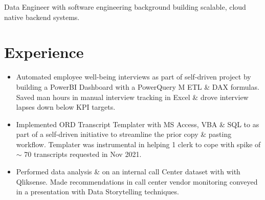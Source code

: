 %
%


\fancyhead{} %


Data Engineer with software engineering background building scalable, cloud native backend systems.

\section{Experience}
\begin{itemize}
  \item Automated employee well-being interviews as part of self-driven project by
    building a PowerBI Dashboard with a PowerQuery M ETL \& DAX formulas. Saved man hours
    in manual interview tracking in Excel \& drove interview lapses down below KPI targets.

  \item Implemented ORD Transcript Templater with MS Access, VBA \& SQL to as part
    of a self-driven initiative to streamline the prior copy \& pasting workflow.
    Templater was instrumental in helping 1 clerk to cope with spike of $\sim$ 
    70 transcripts requested in Nov 2021.

  \item Performed data analysis \& on an internal call Center dataset with
    with Qliksense. Made recommendations in call center vendor monitoring 
    conveyed in a presentation with Data Storytelling techniques.
\end{itemize}

